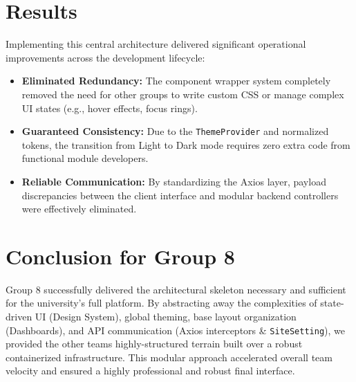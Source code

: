 \documentclass[12pt,a4paper]{report}
\begin{document}
\section{Results}
Implementing this central architecture delivered significant operational improvements across the development lifecycle:
\begin{itemize}
    \item \textbf{Eliminated Redundancy:} The component wrapper system completely removed the need for other groups to write custom CSS or manage complex UI states (e.g., hover effects, focus rings).
    \item \textbf{Guaranteed Consistency:} Due to the \texttt{ThemeProvider} and normalized tokens, the transition from Light to Dark mode requires zero extra code from functional module developers.
    \item \textbf{Reliable Communication:} By standardizing the Axios layer, payload discrepancies between the client interface and modular backend controllers were effectively eliminated.
\end{itemize}

\section{Conclusion for Group 8}
Group 8 successfully delivered the architectural skeleton necessary and sufficient for the university's full platform. By abstracting away the complexities of state-driven UI (Design System), global theming, base layout organization (Dashboards), and API communication (Axios interceptors & \texttt{SiteSetting}), we provided the other teams highly-structured terrain built over a robust containerized infrastructure. This modular approach accelerated overall team velocity and ensured a highly professional and robust final interface.
\end{document}

